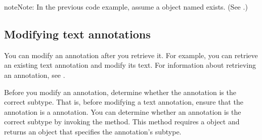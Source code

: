 \documentclass[letterpaper,12pt,english,openany,oneside]{sphinxmanual}
\begin{document}
\begin{sphinxVerbatim}[commandchars=\\\{\}]
     
           


       
            
            
           
\end{sphinxVerbatim}

\begin{sphinxadmonition}{note}{Note:}
In the previous code example, assume a  object named  exists. (See .)
\end{sphinxadmonition}


\subsection{Modifying text annotations}
\label{\detokenize{Plugins_Annotations:modifying-text-annotations}}
You can modify an annotation after you retrieve it. For example, you can retrieve an existing text annotation and modify its text. For information about retrieving an annotation, see .

Before you modify an annotation, determine whether the annotation is the correct subtype. That is, before modifying a text annotation, ensure that the annotation is a  annotation. You can determine whether an annotation is the correct subtype by invoking the  method. This method requires a  object and returns an  object that specifies the annotation’s subtype.
\end{document}
